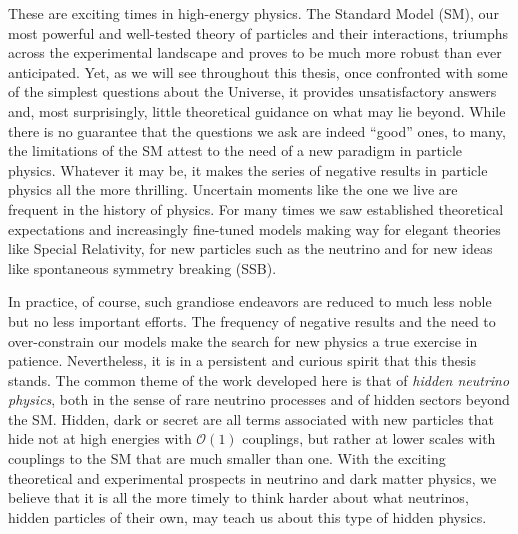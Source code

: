 \graphicspath{{}{introduction/}{Diagrams/}}

These are exciting times in high-energy physics. The Standard Model (SM), our most powerful and well-tested theory of particles and their interactions, triumphs across the experimental landscape and proves to be much more robust than ever anticipated. Yet, as we will see throughout this thesis, once confronted with some of the simplest questions about the Universe, it provides unsatisfactory answers and, most surprisingly, little theoretical guidance on what may lie beyond. While there is no guarantee that the questions we ask are indeed ``good'' ones, to many, the limitations of the SM attest to the need of a new paradigm in particle physics. Whatever it may be, it makes the series of negative results in particle physics all the more thrilling. Uncertain moments like the one we live are frequent in the history of physics. For many times we saw established theoretical expectations and increasingly fine-tuned models making way for elegant theories like Special Relativity, for new particles such as the neutrino and for new ideas like spontaneous symmetry breaking (SSB).

In practice, of course, such grandiose endeavors are reduced to much less noble but no less important efforts. The frequency of negative results and the need to over-constrain our models make the search for new physics a true exercise in patience. Nevertheless, it is in a persistent and curious spirit that this thesis stands. The common theme of the work developed here is that of \emph{hidden neutrino physics}, both in the sense of rare neutrino processes and of hidden sectors beyond the SM. Hidden, dark or secret are all terms associated with new particles that hide not at high energies with $\mathscr{O}(1)$ couplings, but rather at lower scales with couplings to the SM that are much smaller than one. With the exciting theoretical and experimental prospects in neutrino and dark matter physics, we believe that it is all the more timely to think harder about what neutrinos, hidden particles of their own, may teach us about this type of hidden physics. 


